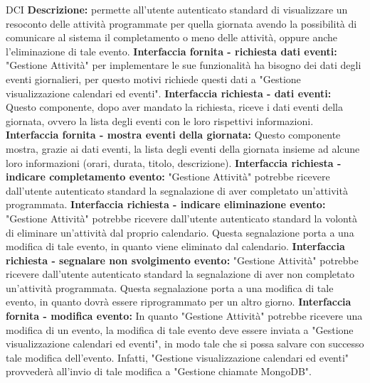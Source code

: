 \begin{listaPersonale}{DCI}
    \textbf{Descrizione:} permette all'utente autenticato standard di visualizzare un resoconto delle attività programmate per quella giornata avendo la possibilità di comunicare al sistema il completamento o meno delle attività, oppure anche l'eliminazione di tale evento.
    \textbf{Interfaccia fornita - richiesta dati eventi:} "Gestione Attività" per implementare le sue funzionalità ha bisogno dei dati degli eventi giornalieri, per questo motivi richiede questi dati a "Gestione visualizzazione calendari ed eventi".
    \textbf{Interfaccia richiesta - dati eventi:} Questo componente, dopo aver mandato la richiesta, riceve i dati eventi della giornata, ovvero la lista degli eventi con le loro rispettivi informazioni.
    \textbf{Interfaccia fornita - mostra eventi della giornata:} Questo componente mostra, grazie ai dati eventi, la lista degli eventi della giornata insieme ad alcune loro informazioni (orari, durata, titolo, descrizione).
    \textbf{Interfaccia richiesta - indicare completamento evento:} "Gestione Attività" potrebbe ricevere dall'utente autenticato standard la segnalazione di aver completato un'attività programmata.
    \textbf{Interfaccia richiesta - indicare eliminazione evento:} "Gestione Attività" potrebbe ricevere dall'utente autenticato standard la volontà di eliminare un'attività dal proprio calendario. Questa segnalazione porta a una modifica di tale evento, in quanto viene eliminato dal calendario.
    \textbf{Interfaccia richiesta - segnalare non svolgimento evento:} "Gestione Attività" potrebbe ricevere dall'utente autenticato standard la segnalazione di aver non completato un'attività programmata.  Questa segnalazione porta a una modifica di tale evento, in quanto dovrà essere riprogrammato per un altro giorno.
    \textbf{Interfaccia fornita - modifica evento:} In quanto "Gestione Attività" potrebbe ricevere una modifica di un evento, la modifica di tale evento deve essere inviata a "Gestione visualizzazione calendari ed eventi", in modo tale che si possa salvare con successo tale modifica dell'evento. Infatti, "Gestione visualizzazione calendari ed eventi" provvederà all'invio di tale modifica a "Gestione chiamate MongoDB".



\end{listaPersonale}
